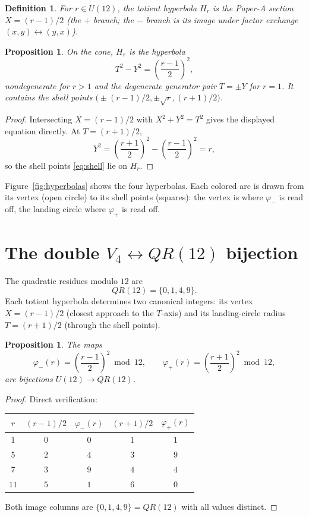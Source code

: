 \documentclass[11pt]{amsart}
\newtheorem{proposition}[theorem]{Proposition}
\newtheorem{definition}[theorem]{Definition}
\theoremstyle{remark}
\begin{document}
\begin{definition}
For $r\in U(12)$, the \emph{totient hyperbola} $H_r$ is the Paper-A
section $X=(r-1)/2$ (the $+$ branch; the $-$ branch is its image under
factor exchange $(x,y)\leftrightarrow(y,x)$).
\end{definition}

\begin{proposition}\label{prop:hyperbola}
On the cone, $H_r$ is the hyperbola
\[
T^2-Y^2=\left(\frac{r-1}{2}\right)^2,
\]
nondegenerate for $r>1$ and the degenerate generator pair $T=\pm Y$
for $r=1$.  It contains the shell points
$\bigl(\pm(r-1)/2,\pm\sqrt r,(r+1)/2\bigr)$.
\end{proposition}
\begin{proof}
Intersecting $X=(r-1)/2$ with $X^2+Y^2=T^2$ gives the displayed
equation directly.  At $T=(r+1)/2$,
\[
Y^2=\left(\frac{r+1}{2}\right)^2-\left(\frac{r-1}{2}\right)^2=r,
\]
so the shell points \eqref{eq:shell} lie on $H_r$.
\end{proof}

Figure~\ref{fig:hyperbolas} shows the four hyperbolas.  Each colored arc
is drawn from its vertex (open circle) to its shell points (squares):
the vertex is where $\varphi_-$ is read off, the landing circle where
$\varphi_+$ is read off.

\section{The double $V_4\leftrightarrow QR(12)$ bijection}

The quadratic residues modulo $12$ are
\[
QR(12)=\{0,1,4,9\}.
\]
Each totient hyperbola determines two canonical integers: its vertex
$X=(r-1)/2$ (closest approach to the $T$-axis) and its landing-circle
radius $T=(r+1)/2$ (through the shell points).

\begin{proposition}\label{prop:bijection}
The maps
\[
\varphi_-(r)=\left(\frac{r-1}{2}\right)^2\bmod 12,
\qquad
\varphi_+(r)=\left(\frac{r+1}{2}\right)^2\bmod 12,
\]
are bijections $U(12)\to QR(12)$.
\end{proposition}
\begin{proof}
Direct verification:
\begin{center}
\begin{tabular}{c|cc|cc}
$r$ & $(r-1)/2$ & $\varphi_-(r)$ & $(r+1)/2$ & $\varphi_+(r)$\\ \hline
$1$ & $0$ & $0$ & $1$ & $1$\\
$5$ & $2$ & $4$ & $3$ & $9$\\
$7$ & $3$ & $9$ & $4$ & $4$\\
$11$ & $5$ & $1$ & $6$ & $0$
\end{tabular}
\end{center}
Both image columns are $\{0,1,4,9\}=QR(12)$ with all values distinct.
\end{proof}
\end{document}
